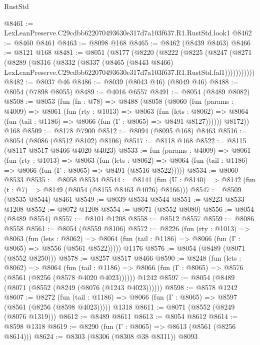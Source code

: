 \begin{lexlean}{RustStd}
\begin{coremodule}
@8461 := LexLeanPreserve.C29cdbb622070493630e317d7a103f637.R1.RustStd.look1
@8462 := @8460 @8461
@8463 := @8098 @168
@8465 := @8462 (@8439 @8463)
@8466 := @8121 @168
@8481 := @8051
    (@8177
      (@8220
        (@8222
          (@8225
            (@8247
              (@8271
                (@8289
                  (@8316
                    (@8332
                      (@8337
                        (@8465
                          (@8443 @8466)
                          LexLeanPreserve.C29cdbb622070493630e317d7a103f637.R1.RustStd.fal1)))))))))))
@8482 := @8037 @46
@8486 := @8039 (@8043 @46) (@8049 @46)
@8488 := @8054 (@7898 @8055)
@8489 := @4016 @6557
@8491 := @8054 (@8489 @8082)
@8508 := @8053
    (fun (fn : @78) =>
    @8488
      (@8058
        (@8060
          (fun (params : @4009) =>
          @8061
            (fun (rty : @1013) =>
            @8063
              (fun (lets : @8062) =>
              @8064 (fun (tail : @1186) => @8066 (fun (Γ : @8065) => @8491 @8127))))))
        @8172))
    @168
@8509 := @8178 @7900
@8512 := @8094 (@8095 @168) @8463
@8516 := @8054 (@8086 (@8512 @8102) @8106)
@8517 := @8118 @168
@8522 := @8115 (@8117 @8517 @8466 @4020 @4023)
@8533 := fun (params : @4009) =>
  @8061
    (fun (rty : @1013) =>
    @8063
      (fun (lets : @8062) =>
      @8064 (fun (tail : @1186) => @8066 (fun (Γ : @8065) => @8491 (@8516 @8522)))))
@8534 := @8060 @8533
@8535 := @8058 @8534
@8544 := @8141 (fun (U : @8140) => @8142 (fun (t : @7) => @8149 (@8054 (@8155 @8463 @4026) @8166)))
@8547 := @8509 (@8535 @8544) @8461
@8549 := @8039 @8534 @8544
@8551 := @8223 @8533 @1208
@8552 := @8072 @1208
@8554 := @8071 (@8552 @8080)
@8556 := @8054 (@8489 @8554)
@8557 := @8101 @1208
@8558 := @8512 @8557
@8559 := @8086 @8558
@8561 := @8054 (@8559 @8106)
@8572 := @8226
    (fun (rty : @1013) =>
    @8063
      (fun (lets : @8062) =>
      @8064 (fun (tail : @1186) => @8066 (fun (Γ : @8065) => @8556 (@8561 @8522)))))
    @1176
@8576 := @8054 (@8489 (@8071 (@8552 @8250)))
@8578 := @8257 @8517 @8466
@8590 := @8248
    (fun (lets : @8062) =>
    @8064
      (fun (tail : @1186) => @8066 (fun (Γ : @8065) => @8576 (@8561 (@8256 (@8578 @4020 @4023))))))
    @1242
@8597 := @8054 (@8489 (@8071 (@8552 (@8249 (@8076 (@1243 @4023))))))
@8598 := @8578 @1242
@8607 := @8272
    (fun (tail : @1186) => @8066 (fun (Γ : @8065) => @8597 (@8561 (@8256 (@8598 @4023)))))
    @1318
@8611 := @8071 (@8552 (@8249 (@8076 @1319)))
@8612 := @8489 @8611
@8613 := @8054 @8612
@8614 := @8598 @1318
@8619 := @8290 (fun (Γ : @8065) => @8613 (@8561 (@8256 @8614)))
@8624 := @8303 (@8306 (@8308 @38 @8311)) @8093

\end{coremodule}
\end{lexlean}
